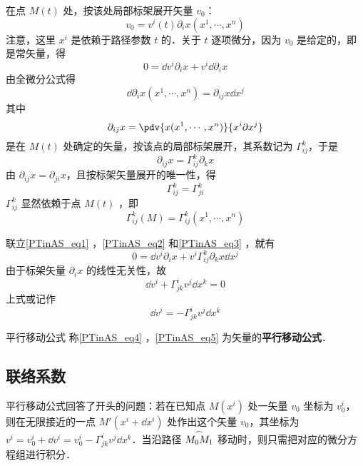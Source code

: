在点 $M(t)$ 处，按该处局部标架展开矢量 $v_0$：
\begin{equation}
v_0=v^i(t)\partial_i x(x^1,\cdots,x^n)
\end{equation}
注意，这里 $x^i$ 是依赖于路径参数 $t$ 的．关于 $t$ 逐项微分，因为 $v_0$ 是给定的，即是常矢量，得
\begin{equation}\label{PTinAS_eq1}
0=\dd v^i\partial_i x+v^i\dd \partial_i x
\end{equation}
由全微分公式得
\begin{equation}\label{PTinAS_eq2}
\dd \partial_i x(x^1,\cdots,x^n)=\partial_{ij}x\dd x^j
\end{equation}
其中
\begin{equation}
\partial_{ij}x=\pdv{x(x^1,\cdots,x^n)}{x^i\partial x^j}
\end{equation}
是在 $M(t)$ 处确定的矢量，按该点的局部标架展开，其系数记为 $\Gamma^k_{ij}$，于是
\begin{equation}\label{PTinAS_eq3}
\partial_{ij}x=\Gamma^k_{ij}\partial_k x
\end{equation}
由 $\partial_{ij} x=\partial_{ji} x$，且按标架矢量展开的唯一性，得
\begin{equation}
\Gamma^k_{ij}=\Gamma^k_{ji}
\end{equation}
 $\Gamma^k_{ij}$ 显然依赖于点 $M(t)$ ，即
 \begin{equation}
 \Gamma^k_{ij}(M)=\Gamma^k_{ij}(x^1,\cdots,x^n)
 \end{equation}
 
联立\autoref{PTinAS_eq1} ，\autoref{PTinAS_eq2} 和\autoref{PTinAS_eq3} ，就有
\begin{equation}
0=\dd v^i\partial_i x+v^i\Gamma^k_{ij}\partial_k x\dd x^j
\end{equation}
由于标架矢量 $\partial_i x$ 的线性无关性，故
\begin{equation}\label{PTinAS_eq4}
\dd v^i+\Gamma^i_{jk}v^j\dd x^k=0
\end{equation}
上式或记作
\begin{equation}\label{PTinAS_eq5}
\dd v^i=-\Gamma^i_{jk}v^j\dd x^k
\end{equation}
\begin{definition}{平行移动公式}
称\autoref{PTinAS_eq4} ，\autoref{PTinAS_eq5} 为矢量的\textbf{平行移动公式}．
\end{definition}
\subsection{联络系数}
平行移动公式回答了开头的问题：若在已知点 $M(x^i)$ 处一矢量 $v_0$ 坐标为 $v_0^i$，则在无限接近的一点 $M'(x^i+\dd x^i)$ 处作出这个矢量 $v_0$，其坐标为 $v^i=v_0^i+\dd v^i=v_0^i-\Gamma^i_{jk}v^j\dd x^k$．当沿路径 $\overset{\Huge\frown}{M_0M_1}$ 移动时，则只需把对应的微分方程组进行积分．

